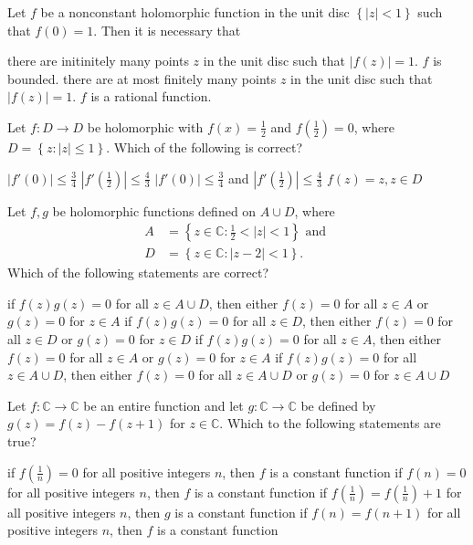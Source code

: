 \documentclass[10pt]{exam}
\newcommand{\C}{\ensuremath{\mathbb{C}}}
\newcommand{\set}[1]{\ensuremath{\left \{ {#1} \right \}}}
\newcommand{\smallb}[1]{\ensuremath{\left ( {#1} \right )}}
\begin{document}
\begin{questions}
\question 
Let $f$ be a nonconstant holomorphic function in the unit disc $\set{|z| < 1}$ such that $f(0) = 1$. Then it is necessary that 

\begin{choices}
\choice there are initinitely many points $z$ in the unit disc such that $|f(z)| = 1$.
\choice $f$ is bounded. 
\choice there are at most finitely  many points $z$ in the unit disc such that $|f(z)| = 1$.
\choice $f$ is a rational function. 
\end{choices}


\question 
Let $f: D \rightarrow D $ be holomorphic with $f(x) = \frac{1}{2}$ and $f \smallb{\frac{1}{2}} = 0$, where $D =\set{z:|z| \leq 1}$. Which of the following is correct?

\begin{checkboxes}
\choice $|f'(0)| \leq \frac{3}{4}$
\choice $|f'\smallb{\frac{1}{2}}| \leq \frac{4}{3}$
\choice $|f'(0)| \leq \frac{3}{4}$ and $|f'\smallb{\frac{1}{2}}| \leq \frac{4}{3}$ 
\choice  $f(z) = z, z \in D $
\end{checkboxes}

\question 
Let $f,g$ be holomorphic functions defined on $A \cup D$, where 
\begin{align*}
A & = \set{z \in \C : \frac{1}{2} < |z| < 1} \text{ and } \\
D & = \set{z \in \C : |z - 2| < 1 }.
\end{align*}
Which of the following statements are correct?

\begin{checkboxes}
\choice if $f(z)g(z) = 0$ for all $z \in A \cup D$, then either $f(z) = 0$ for all $z \in A $ or $g(z)= 0$ for $z \in A$ 
\choice if $f(z)g(z) = 0$ for all $z \in  D$, then either $f(z) = 0$ for all $z \in D $ or $g(z)= 0$ for $z \in D$ 
\choice if $f(z)g(z) = 0$ for all $z \in A$, then either $f(z) = 0$ for all $z \in A $ or $g(z)= 0$ for $z \in A$ 
\choice if $f(z)g(z) = 0$ for all $z \in A \cup D$, then either $f(z) = 0$ for all $z \in A \cup D $ or $g(z)= 0$ for $z \in A \cup D$ 
\end{checkboxes}

\question 
Let $f:\C \rightarrow \C$ be an entire function and let $g:\C \rightarrow \C$ be defined by $g(z) = f(z) - f(z+1)$ for $z \in \C$. Which to the following statements are true?

\begin{checkboxes}
\choice if $f\smallb{\frac{1}{n}}=0$ for all positive integers $n$, then $f$ is a constant function 
\choice if $f\smallb{n}=0$ for all positive integers $n$, then $f$ is a constant function 
\choice if $f\smallb{\frac{1}{n}}=f\smallb{\frac{1}{n}}+1$ for all positive integers $n$, then $g$ is a constant function 
\choice if $f\smallb{n}=f \smallb{n+1}$ for all positive integers $n$, then $f$ is a constant function
\end{checkboxes}


\end{questions}
\end{document}
